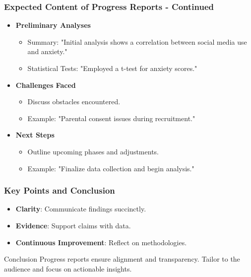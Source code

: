 \documentclass[aspectratio=169]{beamer}
\begin{document}
\begin{frame}[fragile]
    \frametitle{Expected Content of Progress Reports - Continued}
    \begin{itemize}
        \item \textbf{Preliminary Analyses}
            \begin{itemize}
                \item Summary: "Initial analysis shows a correlation between social media use and anxiety."
                \item Statistical Tests: "Employed a t-test for anxiety scores."
            \end{itemize}
        
        \item \textbf{Challenges Faced}
            \begin{itemize}
                \item Discuss obstacles encountered.
                \item Example: "Parental consent issues during recruitment."
            \end{itemize}
        
        \item \textbf{Next Steps}
            \begin{itemize}
                \item Outline upcoming phases and adjustments.
                \item Example: "Finalize data collection and begin analysis."
            \end{itemize}
    \end{itemize}
\end{frame}

\begin{frame}[fragile]
    \frametitle{Key Points and Conclusion}
    \begin{itemize}
        \item \textbf{Clarity}: Communicate findings succinctly.
        \item \textbf{Evidence}: Support claims with data.
        \item \textbf{Continuous Improvement}: Reflect on methodologies.
    \end{itemize}
    \begin{block}{Conclusion}
        Progress reports ensure alignment and transparency. Tailor to the audience and focus on actionable insights.
    \end{block}
\end{frame}
\end{document}
